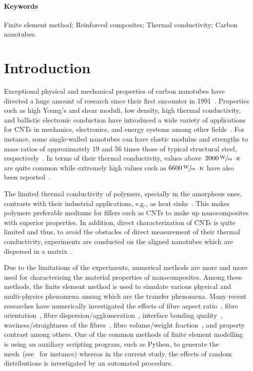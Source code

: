 \paragraph{Keywords} Finite element method; Reinforced composites; Thermal conductivity; Carbon nanotubes.



\section{Introduction}
	Exceptional physical and mechanical properties of carbon nanotubes have directed a huge amount of research since their first encounter in 1991~\autocite{Iijima.1991}. Properties such as high Young's and shear moduli, low density, high thermal conductivity, and ballistic electronic conduction have introduced a wide variety of applications for CNTs in mechanics, electronics, and energy systems among other fields~\autocite{Jorio.2008}. For instance,  some single-walled nanotubes can have elastic modulus and strengths to mass ratios of approximately 19 and 56 times those of typical structural steel, respectively~\autocite{Baughman.2002}. In terms of their thermal conductivity, values above~$2000\,\sfrac{\text{W}}{\text{m}\cdot\text{K}}$ are quite common while extremely high values such as $6600\,\sfrac{\text{W}}{\text{m}\cdot\text{K}}$ have also been reported~\autocite{Berber.2000,Han.2011b}. 

	The limited thermal conductivity of polymers, specially in the amorphous ones, contrasts with their industrial applications, e.g., as heat sinks~\autocite{Han.2011b}. This makes polymers preferable mediums for fillers such as CNTs to make up nanocomposites with superior properties. In addition, direct characterization of CNTs is quite limited and thus, to avoid the obstacles of direct measurement of their thermal conductivity, experiments are conducted on the aligned nanotubes which are dispersed in a matrix~\autocite{Ruoff.1995,Thostenson.2001}.

	Due to the limitations of the experiments, numerical methods are more and more used for characterising the material properties of nanocomposites. Among these methods, the finite element method is used to simulate various physical and multi-physics phenomena among which are the transfer phenomena. Many recent researches have numerically investigated the effects of fibre aspect ratio~\autocite{Lusti.2004,Shan.2002,Afrooz.2015}, fibre orientation~\autocite{Khani.2016,Makvandi.2014b}, fibre dispersion/agglomeration~\autocite{Bakshi.2010,Hedia.2016}, interface bonding quality~\autocite{Giannopoulos.2010,Hedia.2016,Kundalwal.2012}, waviness/straightness of the fibres~\autocite{Bhuiyan.2013,Weidt.2015}, fibre volume/weight fraction~\autocite{Kundalwal.2012b,AlasvandZarasvand.2016,Chen.2004}, and property contrast among others. One of the common methods of finite element modelling is using an auxiliary scripting program, such as Python, to generate the mesh~(see~\autocite{Jafari.2011} for instance) whereas in the current study, the effects of random distributions is investigated by an automated procedure.
